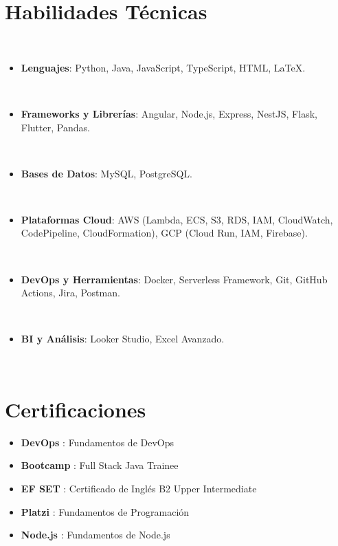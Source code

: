 \documentclass[letterpaper,11pt]{article}
\newcommand{\resumeItem}[2]{
	\item\small{\textbf{#1} #2}
}
\newcommand{\resumeSubItem}[2]{\resumeItem{#1}{#2}}
\newcommand{\resumeSubItemcol}[2]{\resumeItem{#1}{#2}}
\newcommand{\resumeSubHeadingListStart}{\begin{itemize}[leftmargin=0.2cm]}
\newcommand{\resumeSubHeadingListEnd}{\end{itemize}}
\begin{document}
\section{Habilidades Técnicas}
 \resumeSubHeadingListStart
 \resumeSubItem{}{\textbf{Lenguajes}{: Python, Java, JavaScript, TypeScript, HTML, LaTeX.}}
 \resumeSubItem{}{\textbf{Frameworks y Librerías}{: Angular, Node.js, Express, NestJS, Flask, Flutter, Pandas.}}
 \resumeSubItem{}{\textbf{Bases de Datos}{: MySQL, PostgreSQL.}}
 \resumeSubItem{}{\textbf{Plataformas Cloud}{: AWS (Lambda, ECS, S3, RDS, IAM, CloudWatch, CodePipeline, CloudFormation), GCP (Cloud Run, IAM, Firebase).}}
 \resumeSubItem{}{\textbf{DevOps y Herramientas}{: Docker, Serverless Framework, Git, GitHub Actions, Jira, Postman.}}
 \resumeSubItem{}{\textbf{BI y Análisis}{: Looker Studio, Excel Avanzado.}}
 \resumeSubHeadingListEnd


\section{Certificaciones}
\resumeSubHeadingListStart
    \resumeSubItemcol{DevOps}{: Fundamentos de DevOps}
    \resumeSubItemcol{Bootcamp}{: Full Stack Java Trainee}
	\resumeSubItemcol{EF SET}{: Certificado de Inglés B2 Upper Intermediate}
	\resumeSubItemcol{Platzi}{: Fundamentos de Programación}
	\resumeSubItemcol{Node.js}{: Fundamentos de Node.js}
\resumeSubHeadingListEnd
\end{document}
